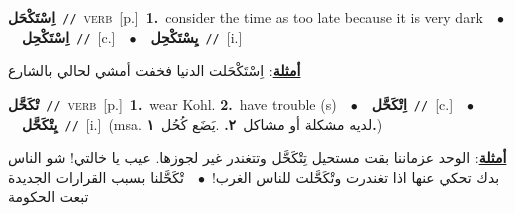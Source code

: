 \documentclass[10pt,a4paper,twoside]{article} %
\begin{document}
\begin{multicols}{2}
{\setlength\topsep{0pt}\textbf{\foreignlanguage{arabic}{اِسْتَكْحَل}}\ {\color{gray}\texttt{//}\color{black}}\ \textsc{verb}\ [p.]\ \textbf{1.}~consider the time as too late because it is very dark\ \ $\bullet$\ \ \setlength\topsep{0pt}\textbf{\foreignlanguage{arabic}{اِسْتَكْحِل}}\ {\color{gray}\texttt{//}\color{black}}\ [c.]\ \ $\bullet$\ \ \setlength\topsep{0pt}\textbf{\foreignlanguage{arabic}{يِسْتَكْحِل}}\ {\color{gray}\texttt{//}\color{black}}\ [i.]\  \begin{flushright}\color{gray}\foreignlanguage{arabic}{\textbf{\underline{\foreignlanguage{arabic}{أمثلة}}}: اِسْتَكْحَلت الدنيا فخفت أمشي لحالي بالشارع}\end{flushright}\color{black}} \vspace{2mm}

{\setlength\topsep{0pt}\textbf{\foreignlanguage{arabic}{تْكَحَّل}}\ {\color{gray}\texttt{//}\color{black}}\ \textsc{verb}\ [p.]\ \textbf{1.}~wear Kohl.  \textbf{2.}~have trouble (s)\ \ $\bullet$\ \ \setlength\topsep{0pt}\textbf{\foreignlanguage{arabic}{اِتْكَحَّل}}\ {\color{gray}\texttt{//}\color{black}}\ [c.]\ \ $\bullet$\ \ \setlength\topsep{0pt}\textbf{\foreignlanguage{arabic}{يِتْكَحَّل}}\ {\color{gray}\texttt{//}\color{black}}\ [i.]\ \color{gray}(msa. \foreignlanguage{arabic}{لديه مشكلة أو مشاكل}~\foreignlanguage{arabic}{\textbf{٢.}}  .\foreignlanguage{arabic}{يَضَع كُحُل}~\foreignlanguage{arabic}{\textbf{١.}})\color{black}\  \begin{flushright}\color{gray}\foreignlanguage{arabic}{\textbf{\underline{\foreignlanguage{arabic}{أمثلة}}}: الوحد عزماننا بقت مستحيل تِتْكَحَّل وتتغندر غير لجوزها. عيب يا خالتي! شو الناس بدك تحكي عنها اذا تغندرت وتْكَحَّلت للناس الغرب!\ $\bullet$\ \  تْكَحَّلنا بسبب القرارات الجديدة تبعت الحكومة}\end{flushright}\color{black}} \vspace{2mm}


\end{multicols}
\end{document}
